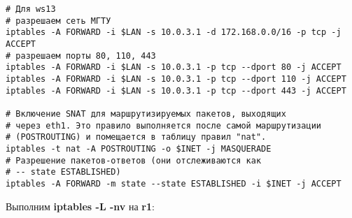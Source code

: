 \documentclass[a4paper,12pt]{article}
\begin{document}
\begin{Verbatim}
# Для ws13
# разрешаем сеть МГТУ
iptables -A FORWARD -i $LAN -s 10.0.3.1 -d 172.168.0.0/16 -p tcp -j ACCEPT
# разрешаем порты 80, 110, 443
iptables -A FORWARD -i $LAN -s 10.0.3.1 -p tcp --dport 80 -j ACCEPT
iptables -A FORWARD -i $LAN -s 10.0.3.1 -p tcp --dport 110 -j ACCEPT
iptables -A FORWARD -i $LAN -s 10.0.3.1 -p tcp --dport 443 -j ACCEPT

# Включение SNAT для маршрутизируемых пакетов, выходящих
# через eth1. Это правило выполняется после самой маршрутизации
# (POSTROUTING) и помещается в таблицу правил "nat".
iptables -t nat -A POSTROUTING -o $INET -j MASQUERADE
# Разрешение пакетов-ответов (они отслеживаются как 
# -- state ESTABLISHED)
iptables -A FORWARD -m state --state ESTABLISHED -i $INET -j ACCEPT
\end{Verbatim}

Выполним \textbf{iptables -L -nv} на \textbf{r1}:
\end{document}
